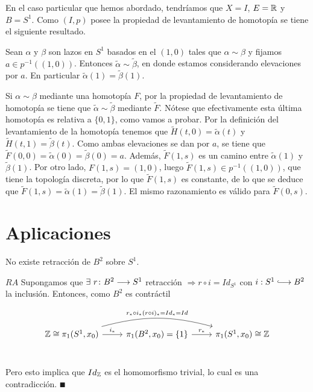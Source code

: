 \documentclass[GTS.tex]{subfiles}
\begin{document}
En el caso particular que hemos abordado, tendríamos que $X=I$, $E=\mathbb{R}$ y $B=S^1$. Como $(I,p)$ posee la propiedad de levantamiento de homotopía se tiene el siguiente resultado. 

\begin{coro}
Sean $\alpha$ y $\beta$ son lazos en $S^1$ basados en el $(1,0)$ tales que $\alpha\sim \beta$ y fijamos $a\in p^{-1}((1,0))$. Entonces $\tilde{\alpha}\sim\tilde{\beta}$, en donde estamos considerando elevaciones por $a$. En particular $\tilde{\alpha}(1)=\tilde{\beta}(1)$.
\end{coro}
\begin{dem}
Si $\alpha\sim\beta$ mediante una homotopía $F$, por la propiedad de levantamiento de homotopía se tiene que $\tilde{\alpha}\sim\tilde{\beta}$ mediante $\widetilde{F}$. Nótese que efectivamente esta última homotopía es relativa a $\{0,1\}$, como vamos a probar. Por la definición del levantamiento de la homotopía tenemos que $\widetilde{H}(t,0)=\tilde{\alpha}(t)$ y $\widetilde{H}(t,1)=\tilde{\beta}(t)$. Como ambas elevaciones se dan por $a$, se tiene que $\widetilde{F}(0,0)=\tilde{\alpha}(0)=\tilde{\beta}(0)=a$. Además, $\tilde{F}(1,s)$ es un camino entre $\tilde{\alpha}(1)$ y $\tilde{\beta}(1)$. Por otro lado, $F(1,s)=(1,0)$, luego $\widetilde{F}(1,s)\in p^{-1}((1,0))$, que tiene la topología discreta, por lo que $\widetilde{F}(1,s)$ es constante, de lo que se deduce que $\widetilde{F}(1,s)=\tilde{\alpha}(1)=\tilde{\beta}(1)$. El mismo razonamiento es válido para $\widetilde{F}(0,s)$. 
\end{dem}
\section{Aplicaciones}

\begin{teorema} No existe retracción de $B^2$ sobre $S^1$.
\end{teorema}
\begin{dem}
$\boxed{RA}$ Supongamos que $\exists\ r\func{B^2}{S^1}$ retracción $\Rightarrow r\circ i=Id_{S^1}$ con $i:S^1\longhookarrow B^2$ la inclusión. Entonces, como $B^2$ es contráctil

\[
\begin{tikzcd}
\Z\cong\pi_1(S^1,x_0)\arrow[r, "i_*"]\arrow[rr, "r_*\circ i_*(r\circ i)_*=Id_*=Id", bend right=-15] & \pi_1(B^2,x_0)=\{1\} \arrow[r, "r_*"] & \pi_1(S^1,x_0)\cong\Z \\
\end{tikzcd}
\]

Pero esto implica que $Id_{\mathbb{Z}}$ es el homomorfismo trivial, lo cual es una contradicción. $\QED$
\end{dem}
\end{document}
